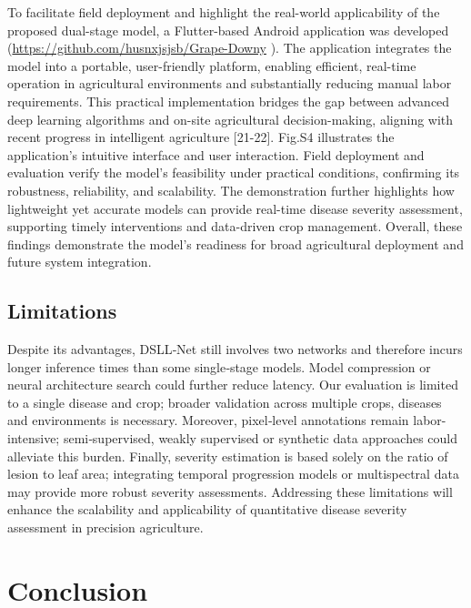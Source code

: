 \documentclass[
]{article}
\begin{document}
To facilitate field deployment and highlight the real-world
applicability of the proposed dual-stage model, a Flutter-based Android
application was developed
(\url{https://github.com/husnxjsjsb/Grape-Downy} ). The application
integrates the model into a portable, user-friendly platform, enabling
efficient, real-time operation in agricultural environments and
substantially reducing manual labor requirements. This practical
implementation bridges the gap between advanced deep learning algorithms
and on-site agricultural decision-making, aligning with recent progress
in intelligent agriculture {[}21-22{]}. Fig.S4 illustrates the
application's intuitive interface and user interaction. Field deployment
and evaluation verify the model's feasibility under practical
conditions, confirming its robustness, reliability, and scalability. The
demonstration further highlights how lightweight yet accurate models can
provide real-time disease severity assessment, supporting timely
interventions and data-driven crop management. Overall, these findings
demonstrate the model's readiness for broad agricultural deployment and
future system integration.

\hypertarget{limitations}{%
\subsection{Limitations}\label{limitations}}

Despite its advantages, DSLL‑Net still involves two networks and
therefore incurs longer inference times than some single‑stage models.
Model compression or neural architecture search could further reduce
latency. Our evaluation is limited to a single disease and crop; broader
validation across multiple crops, diseases and environments is
necessary. Moreover, pixel‑level annotations remain labor-intensive;
semi‑supervised, weakly supervised or synthetic data approaches could
alleviate this burden. Finally, severity estimation is based solely on
the ratio of lesion to leaf area; integrating temporal progression
models or multispectral data may provide more robust severity
assessments. Addressing these limitations will enhance the scalability
and applicability of quantitative disease severity assessment in
precision agriculture.

\hypertarget{conclusion}{%
\section{Conclusion}\label{conclusion}}
\end{document}
